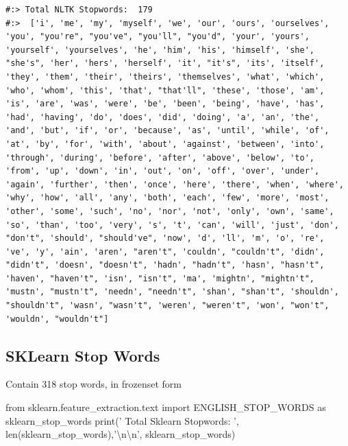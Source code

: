 \documentclass[
]{book}
\newenvironment{Shaded}{\begin{snugshade}}{\end{snugshade}}
\newcommand{\BuiltInTok}[1]{#1}
\newcommand{\CharTok}[1]{\textcolor[rgb]{0.5,0.5,0.5}{#1}}
\newcommand{\ImportTok}[1]{#1}
\newcommand{\NormalTok}[1]{#1}
\newcommand{\StringTok}[1]{\textcolor[rgb]{0.5,0.5,0.5}{#1}}
\begin{document}
\begin{verbatim}
#:> Total NLTK Stopwords:  179 
#:>  ['i', 'me', 'my', 'myself', 'we', 'our', 'ours', 'ourselves', 'you', "you're", "you've", "you'll", "you'd", 'your', 'yours', 'yourself', 'yourselves', 'he', 'him', 'his', 'himself', 'she', "she's", 'her', 'hers', 'herself', 'it', "it's", 'its', 'itself', 'they', 'them', 'their', 'theirs', 'themselves', 'what', 'which', 'who', 'whom', 'this', 'that', "that'll", 'these', 'those', 'am', 'is', 'are', 'was', 'were', 'be', 'been', 'being', 'have', 'has', 'had', 'having', 'do', 'does', 'did', 'doing', 'a', 'an', 'the', 'and', 'but', 'if', 'or', 'because', 'as', 'until', 'while', 'of', 'at', 'by', 'for', 'with', 'about', 'against', 'between', 'into', 'through', 'during', 'before', 'after', 'above', 'below', 'to', 'from', 'up', 'down', 'in', 'out', 'on', 'off', 'over', 'under', 'again', 'further', 'then', 'once', 'here', 'there', 'when', 'where', 'why', 'how', 'all', 'any', 'both', 'each', 'few', 'more', 'most', 'other', 'some', 'such', 'no', 'nor', 'not', 'only', 'own', 'same', 'so', 'than', 'too', 'very', 's', 't', 'can', 'will', 'just', 'don', "don't", 'should', "should've", 'now', 'd', 'll', 'm', 'o', 're', 've', 'y', 'ain', 'aren', "aren't", 'couldn', "couldn't", 'didn', "didn't", 'doesn', "doesn't", 'hadn', "hadn't", 'hasn', "hasn't", 'haven', "haven't", 'isn', "isn't", 'ma', 'mightn', "mightn't", 'mustn', "mustn't", 'needn', "needn't", 'shan', "shan't", 'shouldn', "shouldn't", 'wasn', "wasn't", 'weren', "weren't", 'won', "won't", 'wouldn', "wouldn't"]
\end{verbatim}

\hypertarget{sklearn-stop-words}{%
\subsection{SKLearn Stop Words}\label{sklearn-stop-words}}

Contain 318 stop words, in frozenset form

\begin{Shaded}
\begin{Highlighting}[]
\ImportTok{from}\NormalTok{ sklearn.feature_extraction.text }\ImportTok{import}\NormalTok{ ENGLISH_STOP_WORDS }\ImportTok{as}\NormalTok{ sklearn_stop_words}
\BuiltInTok{print}\NormalTok{(}\StringTok{' Total Sklearn Stopwords: '}\NormalTok{, }\BuiltInTok{len}\NormalTok{(sklearn_stop_words),}\StringTok{'}\CharTok{\textbackslash{}n\textbackslash{}n}\StringTok{'}\NormalTok{,}
\NormalTok{       sklearn_stop_words)}
\end{Highlighting}
\end{Shaded}
\end{document}
